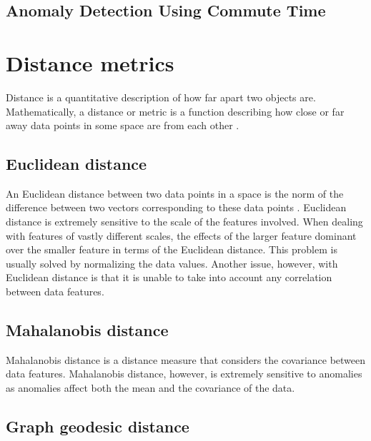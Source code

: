 \subsection{Anomaly Detection Using Commute Time}
\label{sec:anomalyDetectionUsingCommuteTime}

\section{Distance metrics}
\label{sec:distanceMetrics}
Distance is a quantitative description of how far apart two objects are. 
Mathematically, a distance or metric is a function describing how close or far 
away data points in some space are from each other \cite{Khoa:2012}.

\subsection{Euclidean distance}
\label{sec:euclideanDistance}
An Euclidean distance between two data points in a space is the norm of the 
difference between two vectors corresponding to these data points 
\cite{Khoa:2012}. Euclidean distance is extremely sensitive to the scale of the 
features involved. When dealing with features of vastly different scales, the 
effects of the larger feature dominant over the smaller feature in terms of the 
Euclidean distance. This problem is usually solved by normalizing the data 
values. Another issue, however, with Euclidean distance is that it is unable to 
take into account any correlation between data features.

\subsection{Mahalanobis distance}
\label{sec:mahalanobisDistance}
Mahalanobis distance is a distance measure that considers the covariance between
data features. Mahalanobis distance, however, is extremely sensitive to 
anomalies as anomalies affect both the mean and the covariance of the data.

\subsection{Graph geodesic distance}
\label{sec:graphGeodesicDistance}

